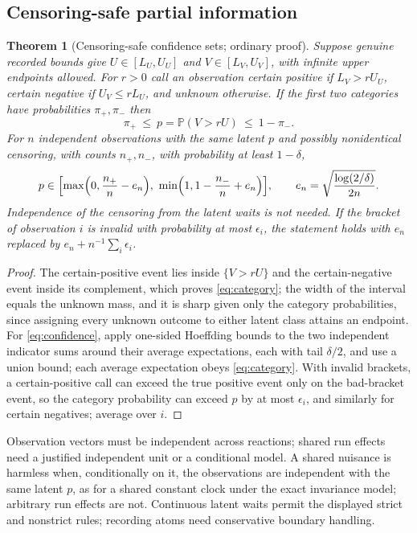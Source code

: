 \documentclass[11pt,a4paper]{article}
\theoremstyle{plain}
\newtheorem{theorem}{Theorem}[section]
\theoremstyle{definition}
\theoremstyle{remark}
\newcommand{\Prob}{\mathbb P}
\begin{document}
\subsection{Censoring-safe partial information}
\begin{theorem}[Censoring-safe confidence sets; ordinary proof]\label{thm:censor}
Suppose genuine recorded bounds give $U\in[L_U,U_U]$ and $V\in[L_V,U_V]$, with infinite upper endpoints allowed. For $r>0$ call an observation certain positive if $L_V>rU_U$, certain negative if $U_V\le rL_U$, and unknown otherwise. If the first two categories have probabilities $\pi_+,\pi_-$ then
\begin{equation}\label{eq:category}
\pi_+\ \le\ p=\Prob(V>rU)\ \le\ 1-\pi_- .
\end{equation}
For $n$ independent observations with the same latent $p$ and possibly nonidentical censoring, with counts $n_+,n_-$, with probability at least $1-\delta$,
\begin{equation}\label{eq:confidence}
p\in\Bigl[\max\Bigl(0,\frac{n_+}n-e_n\Bigr),\ \min\Bigl(1,1-\frac{n_-}n+e_n\Bigr)\Bigr],\qquad e_n=\sqrt{\frac{\log(2/\delta)}{2n}} .
\end{equation}
Independence of the censoring from the latent waits is not needed. If the bracket of observation $i$ is invalid with probability at most $\epsilon_i$, the statement holds with $e_n$ replaced by $e_n+n^{-1}\sum_i\epsilon_i$.
\end{theorem}
\begin{proof}
The certain-positive event lies inside $\{V>rU\}$ and the certain-negative event inside its complement, which proves \eqref{eq:category}; the width of the interval equals the unknown mass, and it is sharp given only the category probabilities, since assigning every unknown outcome to either latent class attains an endpoint. For \eqref{eq:confidence}, apply one-sided Hoeffding bounds \citep{hoeffding1963} to the two independent indicator sums around their average expectations, each with tail $\delta/2$, and use a union bound; each average expectation obeys \eqref{eq:category}. With invalid brackets, a certain-positive call can exceed the true positive event only on the bad-bracket event, so the category probability can exceed $p$ by at most $\epsilon_i$, and similarly for certain negatives; average over $i$.
\end{proof}
Observation vectors must be independent across reactions; shared run effects need a justified independent unit or a conditional model. A shared nuisance is harmless when, conditionally on it, the observations are independent with the same latent $p$, as for a shared constant clock under the exact invariance model; arbitrary run effects are not. Continuous latent waits permit the displayed strict and nonstrict rules; recording atoms need conservative boundary handling.
\end{document}
